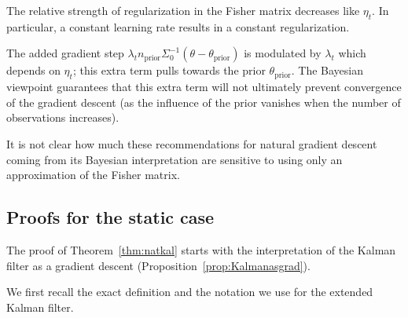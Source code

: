 \documentclass[11pt,a4paper]{article}
\newcommand{\1}{\mathbbm{1}}
\theoremstyle{yannthm}
\theoremstyle{yannthm2}
\numberwithin{equation}{section}
\begin{document}

The relative strength of regularization in the Fisher matrix
decreases like $\eta_t$. In particular, a constant learning rate results
in a constant regularization.

The added gradient step $\lambda_t n_\mathrm{prior}
\Sigma_0^{-1}(\theta-\theta_\text{prior})$ is modulated by $\lambda_t$
which depends on $\eta_t$; this extra term pulls towards the prior
$\theta_\mathrm{prior}$. The Bayesian viewpoint guarantees that this
extra term will not ultimately prevent convergence of the gradient
descent (as the influence of the prior vanishes when the number of
observations increases).

\bigskip

It is not clear how much these recommendations for natural gradient
descent coming from its Bayesian interpretation are sensitive to
using only an approximation of the Fisher matrix.

\subsection{Proofs for the static case}
\label{sec:proofs}

The proof of Theorem~\ref{thm:natkal} starts with the
interpretation of the Kalman filter as a gradient descent
(Proposition~\ref{prop:Kalmanasgrad}).

We first recall the exact definition and the notation we use for the
extended Kalman filter.
\end{document}
